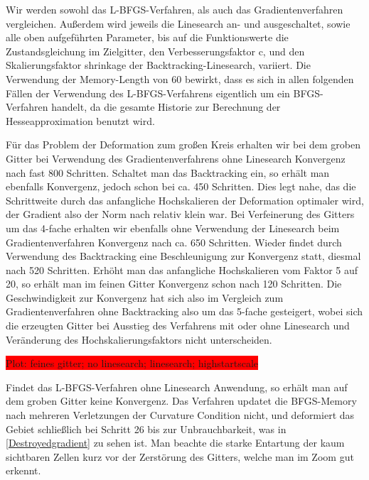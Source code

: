 Wir werden sowohl das L-BFGS-Verfahren, als auch das Gradientenverfahren vergleichen. Außerdem wird jeweils die Linesearch an- und ausgeschaltet, sowie alle oben aufgeführten Parameter, bis auf die Funktionswerte die Zustandsgleichung im Zielgitter, den Verbesserungsfaktor \textsf{c}, und den Skalierungsfaktor \textsf{shrinkage} der Backtracking-Linesearch, variiert. Die Verwendung der Memory-Length von 60 bewirkt, dass es sich in allen folgenden Fällen der Verwendung des L-BFGS-Verfahrens eigentlich um ein BFGS-Verfahren handelt, da die gesamte Historie zur Berechnung der Hesseapproximation benutzt wird. 


Für das Problem der Deformation zum großen Kreis erhalten wir bei dem groben Gitter 
bei Verwendung des Gradientenverfahrens ohne Linesearch Konvergenz nach fast 800 Schritten. Schaltet man das Backtracking ein, so erhält man ebenfalls Konvergenz, jedoch schon bei ca. 450 Schritten. Dies legt nahe, das die Schrittweite durch das anfangliche Hochskalieren der Deformation optimaler wird, der Gradient also der Norm nach relativ klein war. Bei Verfeinerung des Gitters um das 4-fache erhalten wir ebenfalls ohne Verwendung der Linesearch beim Gradientenverfahren Konvergenz nach ca. 650 Schritten. Wieder findet durch Verwendung des Backtracking eine Beschleunigung zur Konvergenz statt, diesmal nach 520 Schritten. Erhöht man das anfangliche Hochskalieren vom Faktor 5 auf 20, so erhält man im feinen Gitter Konvergenz schon nach 120 Schritten. Die Geschwindigkeit zur Konvergenz hat sich also im Vergleich zum Gradientenverfahren ohne Backtracking also um das 5-fache gesteigert, wobei sich die erzeugten Gitter bei Ausstieg des Verfahrens mit oder ohne Linesearch und Veränderung des Hochskalierungsfaktors nicht unterscheiden. 

\colorbox{red}{Plot: feines gitter; no linesearch; linesearch; highstartscale}

Findet das L-BFGS-Verfahren ohne Linesearch Anwendung, so erhält man auf dem groben Gitter keine Konvergenz. Das Verfahren updatet die BFGS-Memory nach mehreren Verletzungen der Curvature Condition nicht, und deformiert das Gebiet schließlich bei Schritt 26 bis zur Unbrauchbarkeit, was in \ref{Destroyedgradient} zu sehen ist. Man beachte die starke Entartung der kaum sichtbaren Zellen kurz vor der Zerstörung des Gitters, welche man im Zoom gut erkennt.



